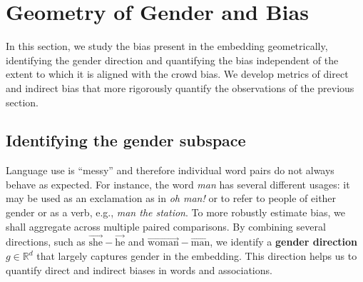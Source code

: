 \documentclass{article}
\newcommand{\wvec}[1]{\overrightarrow{\text{#1}}}
\begin{document}
\section{Geometry of Gender and Bias}\label{sec:bias}

In this section, we study the bias present in the embedding geometrically, identifying the gender direction and quantifying the bias independent of the extent to which it is aligned with the crowd bias. We develop metrics of direct and indirect bias that more rigorously quantify the observations of the previous section. 

\subsection{Identifying the gender subspace}\label{sec:direction}





Language use is ``messy'' and therefore individual word pairs do not always behave as expected. For instance, the word {\em man} has several different usages: it may be used as an exclamation as in {\em oh man!} or to refer to people of either gender or as a verb, e.g., {\em man the station}. To more robustly estimate bias, we shall aggregate across multiple paired comparisons. By combining several directions, such as $\wvec{she}-\wvec{he}$ and $\wvec{woman} - \wvec{man}$, we identify a {\bf gender direction} $g\in \mathbb{R}^d$ that largely captures gender in the embedding. This direction helps us to quantify direct and indirect biases in words and associations. 
\end{document}
